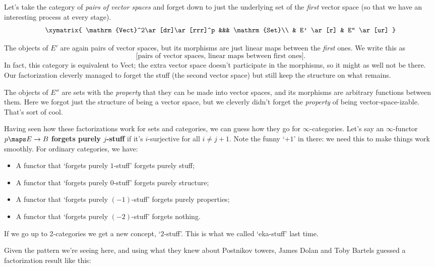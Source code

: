 \documentclass{amsart}
\begin{document}
\begin{eg}
  Let's take the category of \emph{pairs of vector spaces} and forget
  down to just the underlying set of the \emph{first} vector space (so
  that we have an interesting process at every stage).
  \[\xymatrix{
    \mathrm{Vect}^2\ar[dr]\ar[rrr]^p &&& \mathrm{Set}\\
    & E' \ar[r] & E'' \ar[ur]
  }\]

  The objects of $E'$ are again pairs of vector spaces, but its
  morphisms are just linear maps between the \emph{first} ones.  We
  write this as 
  \[
  \big[\text{pairs of vector spaces, linear maps between first ones}\big].
  \]
  In fact, this category is equivalent to Vect; the extra vector space
  doesn't participate in the morphisms, so it might as well not be
  there.  Our factorization cleverly managed to forget the stuff (the
  second vector space) but still keep the structure on what remains.

  The objects of $E''$ are sets with the \emph{property} that they can
  be made into vector spaces, and its morphisms are arbitrary
  functions between them.  Here we forgot just the structure of being
  a vector space, but we cleverly didn't forget the \emph{property} of
  being vector-space-izable.  That's sort of cool.
\end{eg}

Having seen how these factorizations work for sets and categories,
we can guess how they go for $\infty$-categories.  Let's say an 
$\infty$-functor $p \maps E \to B$ {\bf forgets purely $j$-stuff}
if it's $i$-surjective for all $i \ne j+1$.
Note the funny `$+1$' in there: we need this to make things
work smoothly.  For ordinary categories, we have:
\begin{itemize}
\item A functor that `forgets purely $1$-stuff' forgets purely stuff;
\item A functor that `forgets purely $0$-stuff' forgets purely structure;
\item A functor that `forgets purely $(-1)$-stuff' forgets purely properties;
\item A functor that `forgets purely $(-2)$-stuff' forgets nothing.
\end{itemize}
If we go up to 2-categories we get a new concept, `$2$-stuff'.   This 
is what we called `eka-stuff' last time.

Given the pattern we're seeing here, and using what
they knew about Postnikov towers, James Dolan and Toby Bartels
guessed a factorization result like this:
\end{document}
